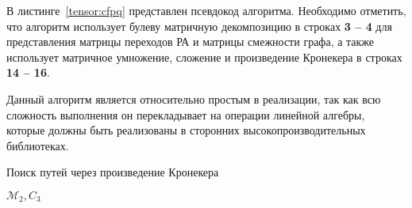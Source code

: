 
В листинге~\ref{tensor:cfpq} представлен псевдокод алгоритма. Необходимо отметить, что алгоритм использует булеву матричную декомпозицию в строках \textbf{3 -- 4} для представления матрицы переходов РА и матрицы смежности графа, а также использует матричное умножение, сложение и произведение Кронекера в строках \textbf{14 -- 16}.

Данный алгоритм является относительно простым в реализации, так как всю сложность выполнения он перекладывает на операции линейной алгебры, которые должны быть реализованы в сторонних высокопроизводительных библиотеках.

\begin{algorithm}[h]
\begin{algorithmic}[1]
\footnotesize
\caption{Поиск путей через произведение Кронекера}
\label{tensor:cfpq}
            \EndFor
        \EndFor
    \EndFor
            \EndFor
        \EndFor
    \EndWhile
\State \Return $\mathcal{M}_2,C_3$
\EndFunction
\end{algorithmic}
\end{algorithm}

